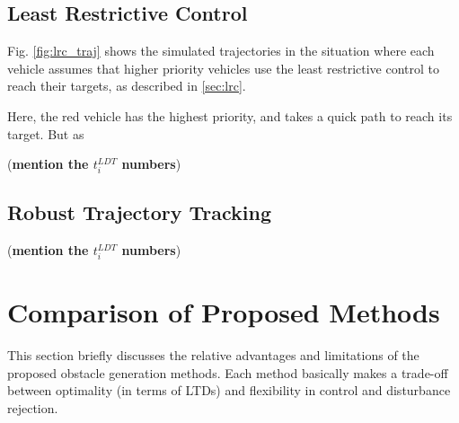 \subsection{Least Restrictive Control}
Fig. \ref{fig:lrc_traj} shows the simulated trajectories in the situation where each vehicle assumes that higher priority vehicles use the least restrictive control to reach their targets, as described in \ref{sec:lrc}. 

Here, the red vehicle has the highest priority, and takes a quick path to reach its target. But as 



(\textbf{mention the $t_i^{LDT}$ numbers})

\subsection{Robust Trajectory Tracking}
%
(\textbf{mention the $t_i^{LDT}$ numbers})

\section{Comparison of Proposed Methods}
This section briefly discusses the relative advantages and limitations of the proposed obstacle generation methods. Each method basically makes a trade-off between optimality (in terms of LTDs) and flexibility in control and disturbance rejection.

